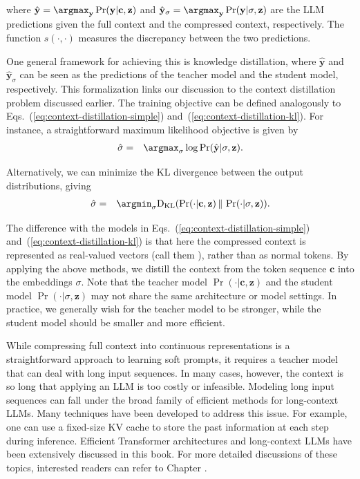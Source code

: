 \noindent where $\hat{\mathbf{y}} = \argmax_{\mathbf{y}} \Pr(\mathbf{y}|\mathbf{c},\mathbf{z})$ and $\hat{\mathbf{y}}_{\sigma} = \argmax_{\mathbf{y}} \Pr(\mathbf{y}|\sigma,\mathbf{z})$ are the LLM predictions given the full context and the compressed context, respectively. The function $s(\cdot,\cdot)$ measures the discrepancy between the two predictions.

One general framework for achieving this is knowledge distillation, where $\hat{\mathbf{y}}$ and $\hat{\mathbf{y}}_{\sigma}$ can be seen as the predictions of the teacher model and the student model, respectively. This formalization links our discussion to the context distillation problem discussed earlier. The training objective can be defined analogously to Eqs.~(\ref{eq:context-distillation-simple}) and~(\ref{eq:context-distillation-kl}). For instance, a straightforward maximum likelihood objective is given by
\begin{eqnarray}
\hat{\sigma} & = & \argmax_{\sigma} \log \Pr(\hat{\mathbf{y}}|\sigma, \mathbf{z}).
\end{eqnarray}

\noindent Alternatively, we can minimize the KL divergence between the output distributions, giving
\begin{eqnarray}
\hat{\sigma} & = & \argmin_{\sigma} \mathrm{D}_{\mathrm{KL}}(\Pr(\cdot|\mathbf{c},\mathbf{z}) \,\|\, \Pr(\cdot|\sigma,\mathbf{z})).
\end{eqnarray}

\noindent The difference with the models in Eqs.~(\ref{eq:context-distillation-simple}) and~(\ref{eq:context-distillation-kl}) is that here the compressed context is represented as real-valued vectors (call them ), rather than as normal tokens. By applying the above methods, we distill the context from the token sequence $\mathbf{c}$ into the embeddings $\sigma$. Note that the teacher model $\Pr(\cdot|\mathbf{c},\mathbf{z})$ and the student model $\Pr(\cdot|\sigma,\mathbf{z})$ may not share the same architecture or model settings. In practice, we generally wish for the teacher model to be stronger, while the student model should be smaller and more efficient.

While compressing full context into continuous representations is a straightforward approach to learning soft prompts, it requires a teacher model that can deal with long input sequences. In many cases, however, the context is so long that applying an LLM is too costly or infeasible. Modeling long input sequences can fall under the broad family of efficient methods for long-context LLMs. Many techniques have been developed to address this issue. For example, one can use a fixed-size KV cache to store the past information at each step during inference. Efficient Transformer architectures and long-context LLMs have been extensively discussed in this book. For more detailed discussions of these topics, interested readers can refer to Chapter \ChapterLLM.

